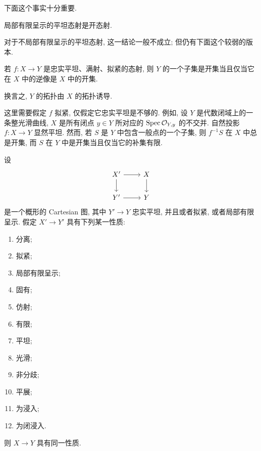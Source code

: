 下面这个事实十分重要.

\begin{proposition}\label{ch01:prop1.12}
局部有限呈示的平坦态射是开态射.
\end{proposition}

对于不局部有限呈示的平坦态射, 这一结论一般不成立; 但仍有下面这个较弱的版本.

\begin{proposition}\label{ch01:prop1.13}
若 $f\colon X\to Y$ 是忠实平坦、满射、拟紧的态射, 则 $Y$ 的一个子集是开集当且仅当它在 $X$ 中的逆像是 $X$ 中的开集.
\end{proposition}

换言之, $Y$ 的拓扑由 $X$ 的拓扑诱导.

\begin{remark}\label{ch01:rem1.14}
这里需要假定 $f$ 拟紧, 仅假定它忠实平坦是不够的. 例如, 设 $Y$ 是代数闭域上的一条整光滑曲线, $X$ 是所有闭点 $y\in Y$ 所对应的 $\operatorname{Spec}\mathcal O_{Y,y}$ 的不交并. 自然投影 $f\colon X\to Y$ 显然平坦. 然而, 若 $S$ 是 $Y$ 中包含一般点的一个子集, 则 $f^{-1}S$ 在 $X$ 中总是开集, 而 $S$ 在 $Y$ 中是开集当且仅当它的补集有限.
\end{remark}

\begin{proposition}\label{ch01:prop1.15}
设
\[\begin{tikzcd}X'\ar[r]\ar[d]&X\ar[d]\\Y'\ar[r]&Y\end{tikzcd}\]
是一个概形的 Cartesian 图, 其中 $Y'\to Y$ 忠实平坦, 并且或者拟紧, 或者局部有限呈示. 假定 $X'\to Y'$ 具有下列某一性质:
\begin{enumerate}
\item 分离;
\item 拟紧;
\item 局部有限呈示;
\item 固有;
\item 仿射;
\item 有限;
\item 平坦;
\item 光滑;
\item 非分歧;
\item 平展;
\item 为浸入;
\item 为闭浸入.
\end{enumerate}
则 $X\to Y$ 具有同一性质.
\end{proposition}

